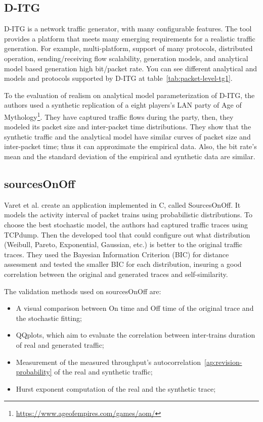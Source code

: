 \subsection{D-ITG}


D-ITG\cite{ditg-paper} is a network traffic generator, with many configurable features. The tool provides a platform that meets many emerging requirements for a realistic traffic generation. For example, multi-platform, support of many protocols, distributed operation, sending/receiving flow scalability, generation models, and analytical model based generation high bit/packet rate. You can see different analytical and models and protocols supported by D-ITG at table~\ref{tab:packet-level-tg1}.

To the evaluation of realism on analytical model parameterization of D-ITG, the authors used a synthetic replication of a eight players's LAN party of Age of Mythology\footnote{\href{https://www.ageofempires.com/games/aom/}{https://www.ageofempires.com/games/aom/}}. They have captured traffic flows during the party,  then, they modeled its packet size and inter-packet time distributions. They show that the synthetic traffic and the analytical model have similar curves of packet size and inter-packet time; thus it can approximate the empirical data. Also, the bit rate's mean and the standard deviation of the empirical and synthetic data are similar.

\subsection{sourcesOnOff}

Varet et al.\cite{sourcesonoff-paper} create an application implemented in C, called SourcesOnOff. It models the activity interval of packet trains using probabilistic distributions. To choose the best stochastic model, the authors had captured traffic traces using TCPdump. Then the developed tool that could configure out what distribution (Weibull, Pareto, Exponential, Gaussian, etc.) is better to the original traffic traces. They used the Bayesian Information Criterion (BIC) for distance assessment and tested the smaller BIC for each distribution, insuring a good correlation between the original and generated traces and self-similarity.  

The validation methods used on sourcesOnOff are:

\begin{itemize}
\item A visual comparison between On time and Off time of the original trace and the stochastic fitting;
\item QQplots, which aim to evaluate the correlation between inter-trains duration of real and generated traffic;
\item Measurement of the measured throughput's autocorrelation~\ref{ap:revision-probability} of the real and synthetic traffic;
\item Hurst exponent computation of the real and the synthetic trace;
\end{itemize}

